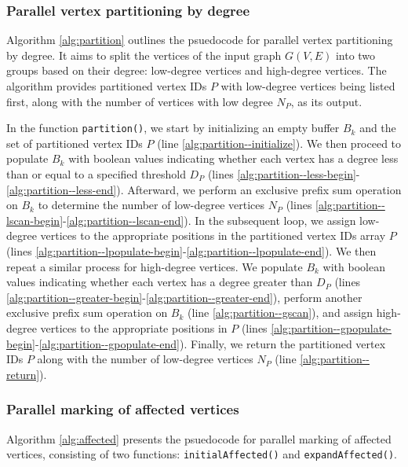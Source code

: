 \subsubsection{Parallel vertex partitioning by degree}

Algorithm \ref{alg:partition} outlines the psuedocode for parallel vertex partitioning by degree. It aims to split the vertices of the input graph $G(V, E)$ into two groups based on their degree: low-degree vertices and high-degree vertices. The algorithm provides partitioned vertex IDs $P$ with low-degree vertices being listed first, along with the number of vertices with low degree $N_P$, as its output.

In the function \texttt{partition()}, we start by initializing an empty buffer $B_k$ and the set of partitioned vertex IDs $P$ (line \ref{alg:partition--initialize}). We then proceed to populate $B_k$ with boolean values indicating whether each vertex has a degree less than or equal to a specified threshold $D_P$ (lines \ref{alg:partition--less-begin}-\ref{alg:partition--less-end}). Afterward, we perform an exclusive prefix sum operation on $B_k$ to determine the number of low-degree vertices $N_P$ (lines \ref{alg:partition--lscan-begin}-\ref{alg:partition--lscan-end}). In the subsequent loop, we assign low-degree vertices to the appropriate positions in the partitioned vertex IDs array $P$ (lines \ref{alg:partition--lpopulate-begin}-\ref{alg:partition--lpopulate-end}). We then repeat a similar process for high-degree vertices. We populate $B_k$ with boolean values indicating whether each vertex has a degree greater than $D_P$ (lines \ref{alg:partition--greater-begin}-\ref{alg:partition--greater-end}), perform another exclusive prefix sum operation on $B_k$ (line \ref{alg:partition--gscan}), and assign high-degree vertices to the appropriate positions in $P$ (lines \ref{alg:partition--gpopulate-begin}-\ref{alg:partition--gpopulate-end}). Finally, we return the partitioned vertex IDs $P$ along with the number of low-degree vertices $N_P$ (line \ref{alg:partition--return}).


\subsubsection{Parallel marking of affected vertices}

Algorithm \ref{alg:affected} presents the psuedocode for parallel marking of affected vertices, consisting of two functions: \texttt{initialAffected()} and \texttt{expandAffected()}.

